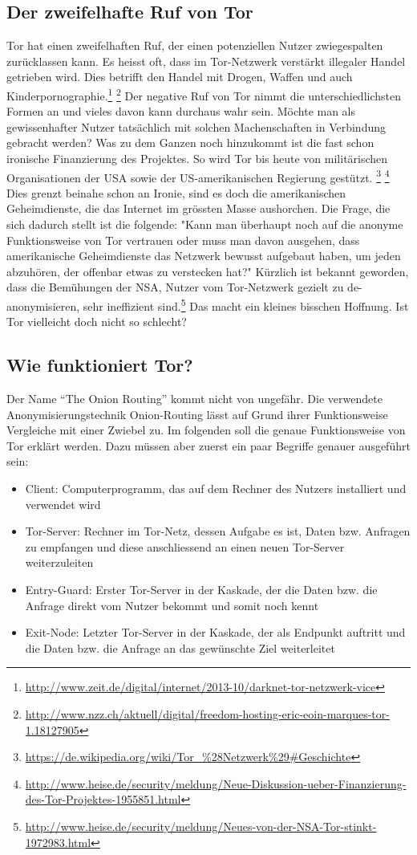 \subsection{Der zweifelhafte Ruf von Tor}
Tor hat einen zweifelhaften Ruf, der einen potenziellen Nutzer zwiegespalten zurücklassen kann. Es heisst oft, dass im Tor-Netzwerk verstärkt illegaler Handel getrieben wird. Dies betrifft den Handel mit Drogen, Waffen und auch Kinderpornographie.\footnote{\url{http://www.zeit.de/digital/internet/2013-10/darknet-tor-netzwerk-vice}} \footnote{\url{http://www.nzz.ch/aktuell/digital/freedom-hosting-eric-eoin-marques-tor-1.18127905}}
Der negative Ruf von Tor nimmt die unterschiedlichsten Formen an und vieles davon kann durchaus wahr sein. Möchte man als gewissenhafter Nutzer tatsächlich mit solchen Machenschaften in Verbindung gebracht werden? Was zu dem Ganzen noch hinzukommt ist die fast schon ironische Finanzierung des Projektes. So wird Tor bis heute von militärischen Organisationen der USA sowie der US-amerikanischen Regierung  gestützt.
\footnote{\url{https://de.wikipedia.org/wiki/Tor_\%28Netzwerk\%29\#Geschichte}}
\footnote{\url{http://www.heise.de/security/meldung/Neue-Diskussion-ueber-Finanzierung-des-Tor-Projektes-1955851.html}}
Dies grenzt beinahe schon an Ironie, sind es doch die amerikanischen Geheimdienste, die das Internet im grössten Masse aushorchen. Die Frage, die sich dadurch stellt ist die folgende: "Kann man überhaupt noch auf die anonyme Funktionsweise von Tor vertrauen oder muss man davon ausgehen, dass amerikanische Geheimdienste das Netzwerk bewusst aufgebaut haben, um jeden abzuhören, der offenbar etwas zu verstecken hat?" Kürzlich ist bekannt geworden, dass die Bemühungen der NSA, Nutzer vom Tor-Netzwerk gezielt zu de-anonymisieren, sehr ineffizient sind.\footnote{\url{http://www.heise.de/security/meldung/Neues-von-der-NSA-Tor-stinkt-1972983.html}}
Das macht ein kleines bisschen Hoffnung. Ist Tor vielleicht doch nicht so schlecht?

\subsection{Wie funktioniert Tor?}
Der Name ``The Onion Routing'' kommt nicht von ungefähr. Die verwendete Anonymisierungstechnik Onion-Routing lässt auf Grund ihrer Funktionsweise Vergleiche mit einer Zwiebel zu. Im folgenden soll die genaue Funktionsweise von Tor erklärt werden. Dazu müssen aber zuerst ein paar Begriffe genauer ausgeführt sein:
\begin{itemize}
\item Client: Computerprogramm, das auf dem Rechner des Nutzers installiert und verwendet wird
\item Tor-Server: Rechner im Tor-Netz, dessen Aufgabe es ist, Daten bzw. Anfragen zu empfangen und diese anschliessend an einen neuen Tor-Server weiterzuleiten
\item Entry-Guard: Erster Tor-Server in der Kaskade, der die Daten bzw. die Anfrage direkt vom Nutzer bekommt und somit noch kennt
\item Exit-Node: Letzter Tor-Server in der Kaskade, der als Endpunkt auftritt und die Daten bzw. die Anfrage an das gewünschte Ziel weiterleitet
\end{itemize}

